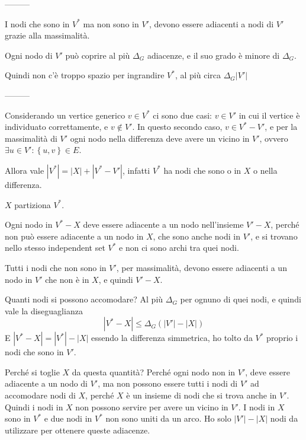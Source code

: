 ---------

I nodi che sono in $V^*$ ma non sono in $V'$, devono essere adiacenti a nodi di $V'$ grazie alla massimalità.

Ogni nodo di $V'$ può coprire al più $\Delta_G$ adiacenze, e il suo grado è minore di $\Delta_G$.

Quindi non c'è troppo spazio per ingrandire $V^*$, al più circa $\Delta_G |V'|$ 

---------

Considerando un vertice generico $v \in V^*$ ci sono due casi:
$v \in V'$ in cui il vertice è individuato correttamente, e 
$v \notin V'$.
In questo secondo caso, $v \in V^* - V'$, e per la massimalità di $V'$ ogni nodo nella differenza deve avere un vicino in $V'$, ovvero $
\exists u \in V' :
\left\{ u, v \right\} \in E
$.

Allora vale $
|V^*| = |X| + |V^* - V'|
$, infatti $V^*$ ha nodi che sono o in $X$ o nella differenza.

$X$ partiziona $V^*$.

Ogni nodo in $V^* - X$ deve essere adiacente a un nodo nell'insieme $
V' - X
$, perché non può essere adiacente a un nodo in $X$, che sono anche nodi in $V'$,
e si trovano nello stesso independent set $V^*$ e non ci sono archi tra quei nodi.

Tutti i nodi che non sono in $V'$, per massimalità, devono essere adiacenti a un nodo in $V'$ che non è in $X$, e quindi $V' - X$.

Quanti nodi si possono accomodare? Al più $\Delta_G $ per ognuno di quei nodi, e quindi vale la diseguaglianza
\begin{equation*}
    | V^* - X |
    \leq
    \Delta_G \left( |V'| - |X| \right)
\end{equation*}
E $
| V^* - X |
=
| V^* | - | X |
$ essendo la differenza simmetrica, ho tolto da $V^*$ proprio i nodi che sono in $V'$.

Perché si toglie $X$ da questa quantità? Perché ogni nodo non in $V'$, deve essere adiacente a un nodo di $V'$, ma non possono essere tutti i nodi di $V'$ ad accomodare nodi di $X$, perché $X$ è un insieme di nodi che si trova anche in $V'$. Quindi i nodi in $X$ non possono servire per avere un vicino in $V'$.
I nodi in $X$ sono in $V^*$ e due nodi in $V^*$ non sono uniti da un arco.
Ho solo $|V'|-|X|$ nodi da utilizzare per ottenere queste adiacenze.



